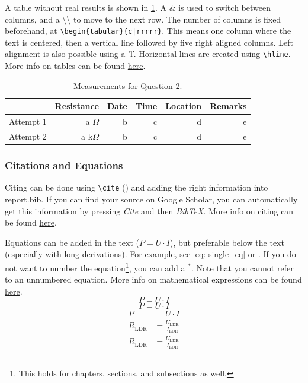 \noindent A table without real results is shown in \cref{tab: resultsQ2}. A \& is used to switch between columns, and a \textbackslash\textbackslash{} to move to the next row. The number of columns is fixed beforehand, at \texttt{\textbackslash begin\{tabular\}\{c|rrrrr\}}. This means one column where the text is centered, then a vertical line followed by five right aligned columns. Left alignment is also possible using a 'l'. Horizontal lines are created using \texttt{\textbackslash hline}. More info on tables can be found \href{https://www.overleaf.com/learn/latex/Tables}{here}.  

\begin{table}[!hbt]
    \centering
    \caption{Measurements for Question 2.}
    \begin{tabular}{c|rrrrr}
      & \textbf{Resistance} & \textbf{Date} & \textbf{Time} & \textbf{Location} & \textbf{Remarks} \\
    \hline 
        Attempt 1 & a $\Omega$  & b & c & d & e \\
        Attempt 2 & a k$\Omega$  & b & c & d & e \\
    \end{tabular}
    \label{tab: resultsQ2}
\end{table}

\subsubsection{Citations and Equations}
\noindent Citing can be done using \texttt{\textbackslash cite} (\cite{DeBruijnvoorbeeld}) and adding the right information into report.bib. If you can find your source on Google Scholar, you can automatically get this information by pressing \textit{Cite} and then \textit{BibTeX}. More info on citing can be found \href{https://www.overleaf.com/learn/latex/Bibliography_management_in_LaTeX}{here}.

\indent Equations can be added in the text ($P = U \cdot I$), but preferable below the text (especially with long derivations). For example, see \cref{eq: single_eq} or . If you do not want to number the equation\footnote{This holds for chapters, sections, and subsections as well.}, you can add a $^*$. Note that you cannot refer to an unnumbered equation. More info on mathematical expressions can be found \href{https://www.overleaf.com/learn/latex/Mathematical_expressions}{here}. 
\begin{equation}
    P = U \cdot I \label{eq: single_eq}
\end{equation}
\begin{equation*}
    P = U \cdot I %
\end{equation*}
\begin{align}
    P &= U \cdot I \label{eq: multi_eq_1} \\
    R_\mathrm{LDR} &= \frac{U_\mathrm{LDR}}{I_\mathrm{LDR}} \label{eq: multi_eq_2} \\
    R_\mathrm{LDR} &= \frac{U_\mathrm{LDR}}{I_\mathrm{LDR}} \nonumber %
\end{align}


